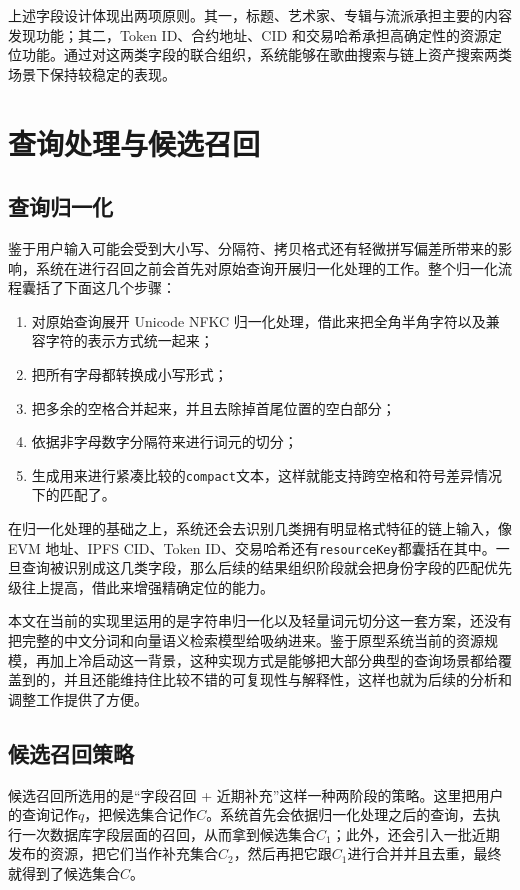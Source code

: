 上述字段设计体现出两项原则。其一，标题、艺术家、专辑与流派承担主要的内容发现功能；其二，Token ID、合约地址、CID 和交易哈希承担高确定性的资源定位功能。通过对这两类字段的联合组织，系统能够在歌曲搜索与链上资产搜索两类场景下保持较稳定的表现。


\section{查询处理与候选召回}

\subsection{查询归一化}

鉴于用户输入可能会受到大小写、分隔符、拷贝格式还有轻微拼写偏差所带来的影响，系统在进行召回之前会首先对原始查询开展归一化处理的工作。整个归一化流程囊括了下面这几个步骤：

\begin{enumerate}
    \item 对原始查询展开 Unicode NFKC 归一化处理，借此来把全角半角字符以及兼容字符的表示方式统一起来；
    \item 把所有字母都转换成小写形式；
    \item 把多余的空格合并起来，并且去除掉首尾位置的空白部分；
    \item 依据非字母数字分隔符来进行词元的切分；
    \item 生成用来进行紧凑比较的\texttt{compact}文本，这样就能支持跨空格和符号差异情况下的匹配了。
\end{enumerate}

在归一化处理的基础之上，系统还会去识别几类拥有明显格式特征的链上输入，像 EVM 地址、IPFS CID、Token ID、交易哈希还有\texttt{resourceKey}都囊括在其中。一旦查询被识别成这几类字段，那么后续的结果组织阶段就会把身份字段的匹配优先级往上提高，借此来增强精确定位的能力。

本文在当前的实现里运用的是字符串归一化以及轻量词元切分这一套方案，还没有把完整的中文分词和向量语义检索模型给吸纳进来。鉴于原型系统当前的资源规模，再加上冷启动这一背景，这种实现方式是能够把大部分典型的查询场景都给覆盖到的，并且还能维持住比较不错的可复现性与解释性，这样也就为后续的分析和调整工作提供了方便。

\subsection{候选召回策略}

候选召回所选用的是“字段召回 + 近期补充”这样一种两阶段的策略。这里把用户的查询记作$q$，把候选集合记作$C$。系统首先会依据归一化处理之后的查询，去执行一次数据库字段层面的召回，从而拿到候选集合$C_1$；此外，还会引入一批近期发布的资源，把它们当作补充集合$C_2$，然后再把它跟$C_1$进行合并并且去重，最终就得到了候选集合$C$。

